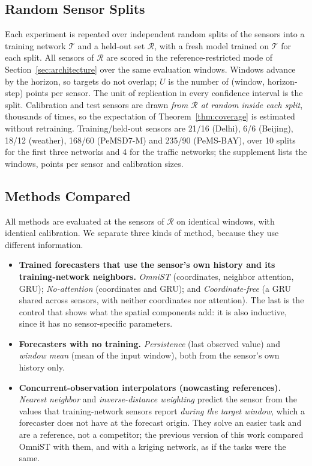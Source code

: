 \documentclass[journal,twoside,web]{ieeecolor}
\begin{document}
\subsection{Random Sensor Splits}
\label{sec:splits}
Each experiment is repeated over independent random splits of the sensors into a training network
$\mathcal{T}$ and a held-out set $\mathcal{R}$, with a fresh model trained on $\mathcal{T}$ for each split. All
sensors of $\mathcal{R}$ are scored in the reference-restricted mode of Section~\ref{sec:architecture} over the same
evaluation windows. Windows advance by the horizon, so targets do not overlap; $U$ is the number of (window,
horizon-step) points per sensor. The unit of replication in every confidence interval is the split. Calibration and
test sensors are drawn \emph{from $\mathcal{R}$ at random inside each split}, thousands of times, so the expectation
of Theorem~\ref{thm:coverage} is estimated without retraining.
Training/held-out sensors are 21/16 (Delhi), 6/6 (Beijing), 18/12 (weather), 168/60 (PeMSD7-M) and 235/90
(PeMS-BAY), over 10 splits for the first three networks and 4 for the traffic networks; the supplement lists
the windows, points per sensor and calibration sizes.

\subsection{Methods Compared}
All methods are evaluated at the sensors of $\mathcal{R}$ on identical windows, with identical
calibration. We separate three kinds of method, because they use different information.
\begin{itemize}
\item \textbf{Trained forecasters that use the sensor's own history and its training-network
neighbors.} \emph{OmniST} (coordinates, neighbor attention, GRU); \emph{No-attention}
(coordinates and GRU); and \emph{Coordinate-free} (a GRU shared across sensors, with neither
coordinates nor attention). The last is the control that shows what the spatial components add: it is
also inductive, since it has no sensor-specific parameters.
\item \textbf{Forecasters with no training.} \emph{Persistence} (last observed value) and
\emph{window mean} (mean of the input window), both from the sensor's own history only.
\item \textbf{Concurrent-observation interpolators (nowcasting references).} \emph{Nearest
neighbor} and \emph{inverse-distance weighting} predict the sensor from the values that training-network
sensors report \emph{during the target window}, which a forecaster does not have at the forecast origin. They solve
an easier task and are a reference, not a competitor; the previous version of this work compared OmniST with them,
and with a kriging network, as if the tasks were the same.
\end{itemize}
\end{document}
